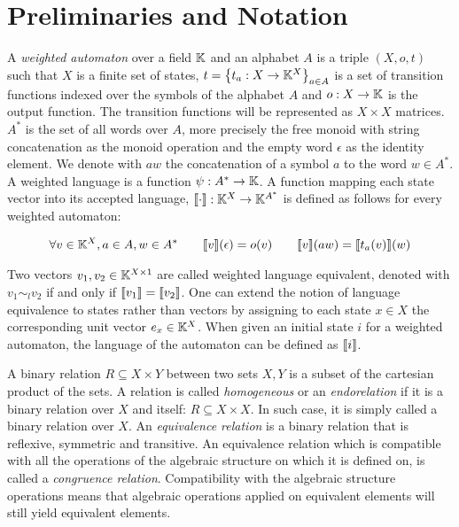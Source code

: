 \section{Preliminaries and Notation}
\label{sec:notation}


\begin{defn}
  A \textit{weighted automaton} over a field $\mathbb{K}$ and an alphabet $A$ is a triple 
  $(X,o,t)$ such that $X$ is a finite set of states, 
  $t = \left\lbrace t_a : X \to \mathbb{K}^X\right\rbrace_{a \in A}$
  is a set of transition functions indexed over the symbols of the alphabet $A$ and 
  $o : X  \to \mathbb{K}$ is the output function. 
  The transition functions will be represented as $X \times X$ matrices.
  $A^*$ is the set of all words over $A$, more precisely the free monoid
  with string concatenation as the monoid operation and the empty word $\epsilon$ 
  as the identity element. We denote with $aw$ the
  concatenation of a symbol $a$ to the word $w \in A^*$.
  A weighted language is a function $\psi: A^* \to \mathbb{K}$.
  A function mapping each state vector into its 
  accepted language, $\llbracket\cdot\rrbracket: \mathbb{K}^X \to \mathbb{K}^{A^*}$ is defined as follows for 
  every weighted automaton:

  \begin{equation*}
    \begin{aligned}
      \forall v \in \mathbb{K}^X, a \in A, w \in A^* \quad \quad
      \llbracket v\rrbracket(\epsilon) = o(v) \quad \quad
      \llbracket v\rrbracket(aw) = \llbracket t_a(v)\rrbracket(w)  
    \end{aligned}
  \end{equation*}
\end{defn}

Two vectors $v_1, v_2 \in \mathbb{K}^{X\times 1}$ are called weighted language equivalent, 
denoted with  $v_1 \sim_l v_2 $ if and only if 
$ \llbracket v_1\rrbracket = \llbracket v_2\rrbracket$. One can extend the notion of language 
equivalence to states rather than vectors by assigning 
to each state $x \in X$ the corresponding  unit vector 
$e_x \in \mathbb{K}^X$. When given an initial state $i$ for a weighted automaton, 
the language  of the automaton can be defined as $\llbracket i\rrbracket$.


\begin{defn}
  A binary relation $R \subseteq X \times Y$ between two sets $X, Y$ is a 
  subset of the 
  cartesian product of the sets. A relation is called \textit{homogeneous} 
  or an \textit
  {endorelation} if it is a binary relation over $X$ and itself: 
  $R \subseteq X \times
   X$. 
  In such case, it is simply called a binary relation over $X$.
  An \textit{equivalence relation} is a binary relation that is reflexive, 
  symmetric and
  transitive. 
  An equivalence relation which is compatible with all the operations of
the algebraic structure on which it is defined on, is called a 
\textit{congruence relation}. Compatibility with the algebraic structure operations
means that algebraic operations applied on equivalent elements will still
yield equivalent elements. 

\end{defn}



